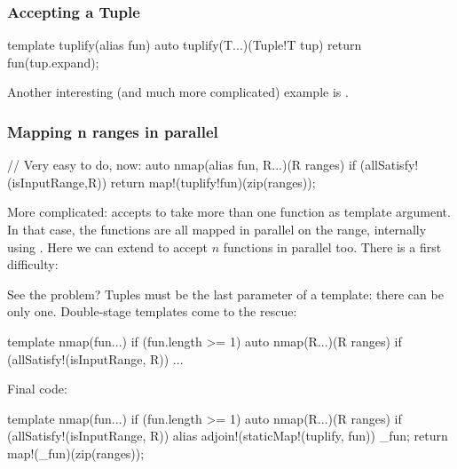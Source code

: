 \subsubsection{Accepting a Tuple}


\begin{dcode}
template tuplify(alias fun)
{
    auto tuplify(T...)(Tuple!T tup)
    {
        return fun(tup.expand);
    }
}
\end{dcode}

Another interesting (and much more complicated) example is .

\subsubsection{Mapping n ranges in parallel}\label{parallelmapping}

\begin{dcode}
// Very easy to do, now:
auto nmap(alias fun, R...)(R ranges) if (allSatisfy!(isInputRange,R))
{
    return map!(tuplify!fun)(zip(ranges));
}
\end{dcode}

More complicated:  accepts to take more than one function as template argument. In that case, the functions are all mapped in parallel on the range, internally using .
Here we can extend  to accept $n$ functions in parallel too. There is a first difficulty:

\begin{dcode}
auto nmap(fun..., R...)(R ranges) if (allSatisfy!(isInputRange, R))
{ ... 
\end{dcode}

See the problem? Tuples must be the last parameter of a template: there can be only one. Double-stage templates come to the rescue:

\begin{dcode}
template nmap(fun...) if (fun.length >= 1)
{
    auto nmap(R...)(R ranges) if (allSatisfy!(isInputRange, R))
    {...}
}
\end{dcode}

Final code:

\begin{dcode}
template nmap(fun...) if (fun.length >= 1)
{
    auto nmap(R...)(R ranges) if (allSatisfy!(isInputRange, R))
    {
        alias adjoin!(staticMap!(tuplify, fun)) _fun;
        return map!(_fun)(zip(ranges));
    }
}
\end{dcode}

